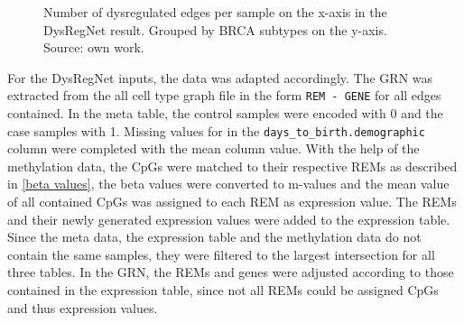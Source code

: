 \documentclass[pdftex,12pt,a4paper]{report}
\begin{document}
\begin{figure}[!ht]
\begin{center}
	\caption{Number of dysregulated edges per sample on the x-axis in the DysRegNet result. Grouped by BRCA subtypes on the y-axis. Source: own work.}
	\label{edges_per_sample}
\end{center}
\end{figure} 
For the DysRegNet inputs, the data was adapted accordingly. The GRN was extracted from the all cell type graph file in the form \texttt{REM - GENE} for all edges contained. In the meta table, the control samples were encoded with 0 and the case samples with 1. Missing values for in the \texttt{days\_to\_birth.demographic} column were completed with the mean column value. With the help of the methylation data, the CpGs were matched to their respective REMs as described in \ref{beta values}, the beta values were converted to m-values and the mean value of all contained CpGs was assigned to each REM as expression value. 
The REMs and their newly generated expression values were added to the expression table. Since the meta data, the expression table and the methylation data do not contain the same samples, they were filtered to the largest intersection for all three tables. In the GRN, the REMs and genes were adjusted according to those contained in the expression table, since not all REMs could be assigned CpGs and thus expression values.
\end{document}
